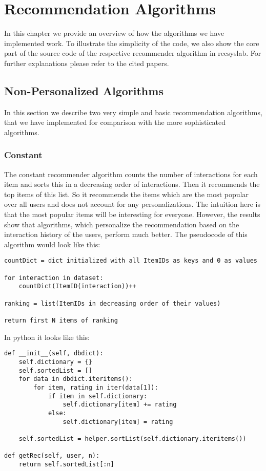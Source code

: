 \chapter{Recommendation Algorithms}
\label{recommendationalgorithms}
In this chapter we provide an overview of how the algorithms we have implemented
work. To illustrate the simplicity of the code, we also show the core part of 
the source code of the respective recommender algorithm in recsyslab.
For further explanations please refer to the cited papers.


\section{Non-Personalized Algorithms}

In this section we describe two very simple and basic recommendation
algorithms, that  we have implemented for comparison with the more sophisticated
algorithms.


\subsection{Constant}

The constant recommender algorithm counts the number of interactions
for each item and sorts this in a decreasing order of interactions.
Then it recommends the top items of this list. So it recommends the
items which are the most popular over all users and does not account for any
personalizations. The intuition here is that the most popular items
will be interesting for everyone. However, the results show that
algorithms, which personalize the recommendation based on the 
interaction history of the users, perform much better.
The pseudocode of this algorithm would look like this:
\begin{lstlisting}[style=pseudocode]
countDict = dict initialized with all ItemIDs as keys and 0 as values

for interaction in dataset:
    countDict(ItemID(interaction))++

ranking = list(ItemIDs in decreasing order of their values)

return first N items of ranking
\end{lstlisting}
In python it looks like this:
\begin{lstlisting}[style=python]
def __init__(self, dbdict):
    self.dictionary = {}
    self.sortedList = []
    for data in dbdict.iteritems():
        for item, rating in iter(data[1]):
            if item in self.dictionary:
                self.dictionary[item] += rating
            else:
                self.dictionary[item] = rating

    self.sortedList = helper.sortList(self.dictionary.iteritems())

def getRec(self, user, n):
    return self.sortedList[:n]
\end{lstlisting}



